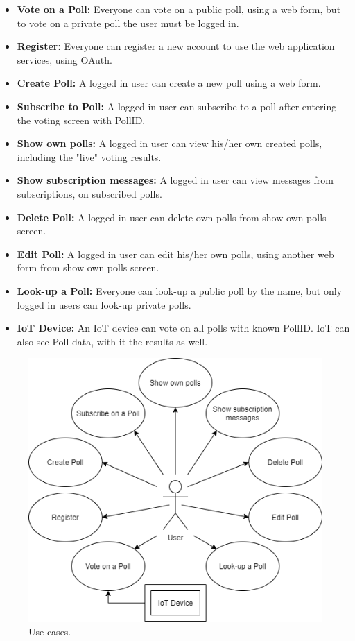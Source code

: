 \begin{itemize}
  \item \textbf{Vote on a Poll:} Everyone can vote on a public poll, using a web form, but to vote on a private poll the user must be logged in.
  \item \textbf{Register:} Everyone can register a new account to use the web application services, using OAuth.
  \item \textbf{Create Poll:} A logged in user can create a new poll using a web form.
  \item \textbf{Subscribe to Poll:} A logged in user can subscribe to a poll after entering the voting screen with PollID.
  \item \textbf{Show own polls:} A logged in user can view his/her own created polls, including the "live" voting results.
  \item \textbf{Show subscription messages:} A logged in user can view messages from subscriptions, on subscribed polls.
  \item \textbf{Delete Poll:} A logged in user can delete own polls from show own polls screen.
  \item \textbf{Edit Poll:} A logged in user can edit his/her own polls, using another web form from show own polls screen.
  \item \textbf{Look-up a Poll:} Everyone can look-up a public poll by the name, but only logged in users can look-up private polls.
  \item \textbf{IoT Device:} An IoT device can vote on all polls with known PollID. IoT can also see Poll data, with-it the results as well.
\end{itemize}
\begin{figure}[H]
  \centering
  \includegraphics[scale=0.45]{figs/usecases.png}
  \caption[scale=0.5]{Use cases.}
  \label{fig:usecases}
\end{figure}

